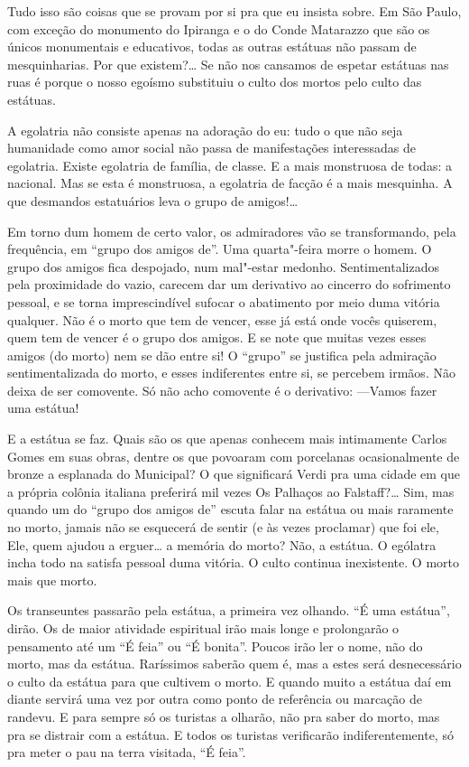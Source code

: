 Tudo isso são coisas que se provam por si pra que eu insista sobre. Em
São Paulo, com exceção do monumento do Ipiranga e o do Conde Matarazzo
que são os únicos monumentais e educativos, todas as outras estátuas não
passam de mesquinharias. Por que existem?\ldots{} Se não nos cansamos de
espetar estátuas nas ruas é porque o nosso egoísmo substituiu o culto
dos mortos pelo culto das estátuas.

A egolatria não consiste apenas na adoração do eu: tudo o que não seja
humanidade como amor social não passa de manifestações interessadas de
egolatria. Existe egolatria de família, de classe. E a mais monstruosa
de todas: a nacional. Mas se esta é monstruosa, a egolatria de facção é
a mais mesquinha. A que desmandos estatuários leva o grupo de amigos!\ldots{}

Em torno dum homem de certo valor, os admiradores vão se transformando,
pela frequência, em ``grupo dos amigos de''. Uma quarta"-feira morre o
homem. O grupo dos amigos fica despojado, num mal"-estar medonho.
Sentimentalizados pela proximidade do vazio, carecem dar um derivativo
ao cincerro do sofrimento pessoal, e se torna imprescindível sufocar o
abatimento por meio duma vitória qualquer. Não é o morto que tem de
vencer, esse já está onde vocês quiserem, quem tem de vencer é o grupo
dos amigos. E se note que muitas vezes esses amigos (do morto) nem se
dão entre si! O ``grupo'' se justifica pela admiração sentimentalizada do
morto, e esses indiferentes entre si, se percebem irmãos. Não deixa de
ser comovente. Só não acho comovente é o derivativo: ---Vamos fazer uma
estátua!

E a estátua se faz. Quais são os que apenas conhecem mais intimamente
Carlos Gomes em suas obras, dentre os que povoaram com porcelanas
ocasionalmente de bronze a esplanada do Municipal? O que significará
Verdi pra uma cidade em que a própria colônia italiana preferirá mil
vezes Os Palhaços ao Falstaff?\ldots{} Sim, mas quando um do ``grupo dos
amigos de'' escuta falar na estátua ou mais raramente no morto, jamais
não se esquecerá de sentir (e às vezes proclamar) que foi ele, Ele, quem
ajudou a erguer\ldots{} a memória do morto? Não, a estátua. O ególatra incha
todo na satisfa pessoal duma vitória. O culto continua inexistente. O
morto mais que morto.

Os transeuntes passarão pela estátua, a primeira vez olhando. ``É uma
estátua'', dirão. Os de maior atividade espiritual irão mais longe e
prolongarão o pensamento até um ``É feia'' ou ``É bonita''. Poucos irão ler
o nome, não do morto, mas da estátua. Raríssimos saberão quem é, mas a
estes será desnecessário o culto da estátua para que cultivem o morto. E
quando muito a estátua daí em diante servirá uma vez por outra como
ponto de referência ou marcação de randevu. E para sempre só os turistas
a olharão, não pra saber do morto, mas pra se distrair com a estátua. E
todos os turistas verificarão indiferentemente, só pra meter o pau na
terra visitada, ``É feia''.

